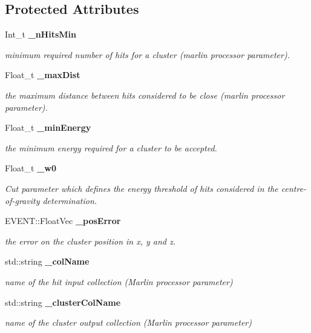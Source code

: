 \subsection*{Protected Attributes}
\begin{DoxyCompactItemize}
\item 
Int\-\_\-t {\bf \-\_\-n\-Hits\-Min}
\begin{DoxyCompactList}\small\item\em minimum required number of hits for a cluster (marlin processor parameter). \end{DoxyCompactList}\item 
Float\-\_\-t {\bf \-\_\-max\-Dist}
\begin{DoxyCompactList}\small\item\em the maximum distance between hits considered to be close (marlin processor parameter). \end{DoxyCompactList}\item 
Float\-\_\-t {\bf \-\_\-min\-Energy}
\begin{DoxyCompactList}\small\item\em the minimum energy required for a cluster to be accepted. \end{DoxyCompactList}\item 
Float\-\_\-t {\bf \-\_\-w0}
\begin{DoxyCompactList}\small\item\em Cut parameter which defines the energy threshold of hits considered in the centre-\/of-\/gravity determination. \end{DoxyCompactList}\item 
E\-V\-E\-N\-T\-::\-Float\-Vec {\bf \-\_\-pos\-Error}
\begin{DoxyCompactList}\small\item\em the error on the cluster position in x, y and z. \end{DoxyCompactList}\item 
std\-::string {\bf \-\_\-col\-Name}\label{classCALICE_1_1Clusteriser_af6a7832cc276de50a9c96649b5b27bc3}

\begin{DoxyCompactList}\small\item\em name of the hit input collection (Marlin processor parameter) \end{DoxyCompactList}\item 
std\-::string {\bf \-\_\-cluster\-Col\-Name}\label{classCALICE_1_1Clusteriser_a2eda1746e521ba46d07556aabdfbfb6b}

\begin{DoxyCompactList}\small\item\em name of the cluster output collection (Marlin processor parameter) \end{DoxyCompactList}\end{DoxyCompactItemize}
